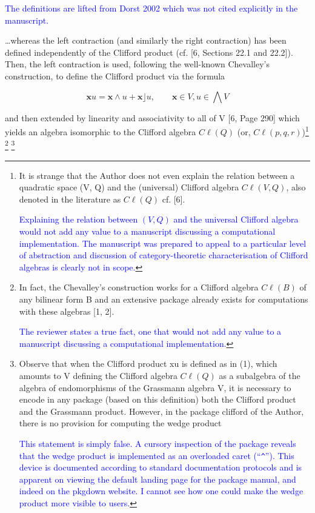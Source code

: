 \documentclass{article}
\newcommand{\cliff}[1]{\ensuremath{C\ell\left(#1\right)}}
\begin{document}
\begin{itemize}
    \textcolor{blue}{The definitions are lifted from Dorst 2002 which
      was not cited explicitly in the manuscript.}

    \ldots whereas the left contraction (and similarly the
    right contraction) has been defined independently of the Clifford
    product (cf. [6, Sections 22.1 and 22.2]). Then, the left
    contraction is used, following the well-known Chevalley’s
    construction, to define the Clifford product via the formula

    $$
    \mathbf{x}u=\mathbf{x}\wedge u + \mathbf{x}\rfloor u,\qquad\mathbf{x}\in V,u\in\bigwedge V
    $$

and then extended by linearity and associativity to all of V [6, Page
  290] which yields an algebra isomorphic to the Clifford algebra
\cliff{Q} (or, \cliff{p, q, r})\footnote{It is strange that the Author
does not even explain the relation between a quadratic space (V, Q)
and the (universal) Clifford algebra \cliff{V, Q}, also denoted in the
literature as \cliff{Q} cf. [6].

\textcolor{blue}{Explaining the relation between $(V,Q)$ and the
  universal Clifford algebra would not add any value to a manuscript
  discussing a computational implementation.  The manuscript was
  prepared to appeal to a particular level of abstraction and
  discussion of category-theoretic characterisation of Clifford
  algebras is clearly not in scope.}  } \footnote{In fact, the
Chevalley’s construction works for a Clifford algebra \cliff{B} of any
bilinear form B and an extensive package already exists for
computations with these algebras [1, 2].

\textcolor{blue}{The reviewer states a true fact, one that would not
  add any value to a manuscript discussing a computational
  implementation.}} \footnote{Observe that when the Clifford product
xu is defined as in (1), which amounts to V defining the Clifford
algebra \cliff{Q} as a subalgebra of the algebra of endomorphisms of
the Grassmann algebra V, it is necessary to encode in any package
(based on this definition) both the Clifford product and the Grassmann
product. However, in the package clifford of the Author, there is no
provision for computing the wedge product

\textcolor{blue}{This statement is simply false.  A cursory inspection
  of the package reveals that the wedge product is implemented as an
  overloaded caret (``{\tt\string^}'').  This device is documented
  according to standard documentation protocols and is apparent on
  viewing the default landing page for the package manual, and indeed
  on the pkgdown website.  I cannot see how one could make the wedge
  product more visible to users.}  }


\end{itemize}
\end{document}
